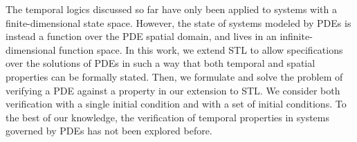 \documentclass[letterpaper, 10 pt, conference]{ieeeconf/ieeeconf}
\begin{document}
%

The temporal logics discussed so far have only been applied to systems with a
finite-dimensional state space. However, the state of systems modeled by
PDEs is instead a function over the PDE spatial domain, and lives in an
infinite-dimensional function space. In this work, we extend STL to allow
specifications over the solutions of PDEs in such a way that both temporal and
spatial properties can be formally stated. Then, we formulate and solve the problem 
of verifying a PDE against a property in our extension to STL. We consider both verification
with a single initial condition and with a set of initial conditions.
To the best of our knowledge, the verification 
of temporal properties in systems governed by PDEs has not been explored before.
\end{document}
